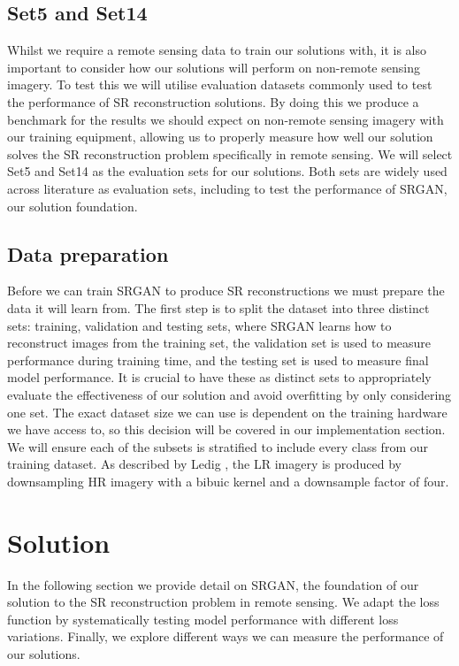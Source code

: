 \subsection{Set5 and Set14}
Whilst we require a remote sensing data to train our solutions with, it is also important to consider how our solutions will perform on non-remote sensing imagery. To test this we will utilise evaluation datasets commonly used to test the performance of SR reconstruction solutions. By doing this we produce a benchmark for the results we should expect on non-remote sensing imagery with our training equipment, allowing us to properly measure how well our solution solves the SR reconstruction problem specifically in remote sensing. We will select Set5 and Set14 as the evaluation sets for our solutions. Both sets are widely used across literature as evaluation sets, including to test the performance of SRGAN, our solution foundation.

\subsection{Data preparation}\label{subsec:data_preparation}
Before we can train SRGAN to produce SR reconstructions we must prepare the data it will learn from. The first step is to split the dataset into three distinct sets: training, validation and testing sets, where SRGAN learns how to reconstruct images from the training set, the validation set is used to measure performance during training time, and the testing set is used to measure final model performance. It is crucial to have these as distinct sets to appropriately evaluate the effectiveness of our solution and avoid overfitting by only considering one set. The exact dataset size we can use is dependent on the training hardware we have access to, so this decision will be covered in our implementation section. We will ensure each of the subsets is stratified to include every class from our training dataset. As described by Ledig \etal, the LR imagery is produced by downsampling HR imagery with a bibuic kernel and a downsample factor of four.

\section{Solution}
In the following section we provide detail on SRGAN, the foundation of our solution to the SR reconstruction problem in remote sensing. We adapt the loss function by systematically testing model performance with different loss variations. Finally, we explore different ways we can measure the performance of our solutions.

